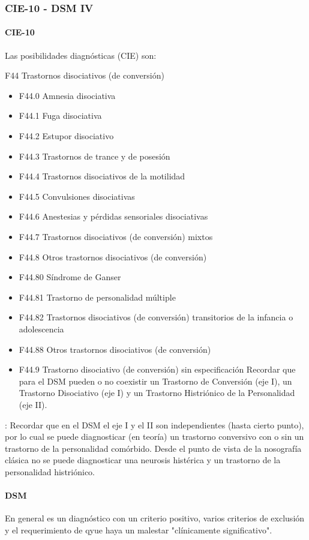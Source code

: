\documentclass{scrbook}
\begin{document}
\subsubsection*{CIE-10 - DSM IV}
\paragraph{CIE-10}
Las posibilidades diagnósticas (CIE) son:

F44 Trastornos disociativos (de conversión)
\begin{itemize}
	\item F44.0 Amnesia disociativa
	\item F44.1 Fuga disociativa
	\item F44.2 Estupor disociativo
	\item F44.3 Trastornos de trance y de posesión
	\item F44.4 Trastornos disociativos de la motilidad
	\item F44.5 Convulsiones disociativas
	\item F44.6 Anestesias y pérdidas sensoriales disociativas
	\item F44.7 Trastornos disociativos (de conversión) mixtos
	\item F44.8 Otros trastornos disociativos (de conversión)
	\item F44.80 Síndrome de Ganser
	\item F44.81 Trastorno de personalidad múltiple
	\item F44.82 Trastornos disociativos (de conversión) transitorios de la infancia o adolescencia
	\item F44.88 Otros trastornos disociativos (de conversión)
	\item F44.9 Trastorno disociativo (de conversión) sin especificación Recordar que para el DSM pueden o no coexistir un Trastorno de Conversión (eje I), un Trastorno Disociativo (eje I) y un Trastorno Histriónico de la Personalidad (eje II).
\end{itemize}

\faLightbulb: Recordar que en el DSM el eje I y el II son independientes (hasta cierto punto), por lo cual se puede diagnosticar (en teoría) un trastorno conversivo con o sin un trastorno de la personalidad comórbido. Desde el punto de vista de la nosografía clásica no se puede diagnosticar una neurosis histérica y un trastorno de la personalidad histriónico.

\paragraph{DSM}
En general es un diagnóstico con un criterio positivo, varios criterios de exclusión y el requerimiento de qyue haya un malestar "clínicamente significativo".
\end{document}
